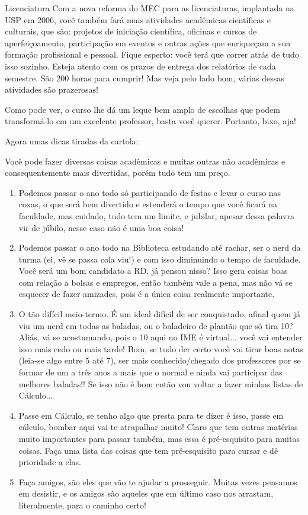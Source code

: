 \begin{subsecao}{Licenciatura}
Com a nova reforma do MEC para as licenciaturas, implantada na USP em 2006,
você também fará mais atividades acadêmicas científicas e culturais, que são:
projetos de iniciação científica, oficinas e cursos de aperfeiçoamento,
participação em eventos e outras ações que enriqueçam a sua formação
profissional e pessoal. Fique esperto: você terá que correr atrás de tudo isso
sozinho. Esteja atento com os prazos de entrega dos relatórios de cada
semestre. São 200 horas para cumprir! Mas veja pelo lado bom, várias dessas
atividades são prazerosas!

Como pode ver, o curso lhe dá um leque bem amplo de escolhas que podem
transformá-lo em um excelente professor, basta você querer. Portanto, bixo, aja!

Agora umas dicas tiradas da cartola:

Você pode fazer diversas coisas acadêmicas e muitas outras não acadêmicas e
consequentemente mais divertidas, porém tudo tem um preço.
\begin{enumerate}
\item	Podemos passar o ano todo só participando de festas e levar o curso nas
coxas, o que será bem divertido e estenderá o tempo que você ficará na
faculdade, mas cuidado, tudo tem um limite, e jubilar, apesar dessa palavra vir
de júbilo, nesse caso não é uma boa coisa!
\item	Podemos passar o ano todo na Biblioteca estudando até rachar, ser o nerd
da turma (ei, vê se passa cola viu!) e com isso diminuindo o tempo de
faculdade. Você será um bom candidato a RD, já pensou nisso? Isso gera coisas
boas com relação a bolsas e empregos, então também vale a pena, mas não vá se
esquecer de fazer amizades, pois é a única coisa realmente importante.
\item	O tão difícil meio-termo. É um ideal difícil de ser conquistado, afinal
quem já viu um nerd em todas as baladas, ou o baladeiro de plantão que só
tira 10? Aliás, vá se acostumando, pois o 10 aqui no IME é virtual... você vai
entender isso mais cedo ou mais tarde! Bom, se tudo der certo você vai tirar
boas notas (leia-se algo entre 5 até 7), ser mais conhecido/chegado dos
professores por se formar de um a três anos a mais que o normal e ainda vai
participar das melhores baladas!! Se isso não é bom então vou voltar a fazer
minhas listas de Cálculo...
\item	Passe em Cálculo, se tenho algo que presta para te dizer é isso, passe em
cálculo, bombar aqui vai te atrapalhar muito! Claro que tem outras matérias
muito importantes para passar também, mas essa é pré-esquisito para muitas
coisas. Faça uma lista das coisas que tem pré-esquisito para cursar e dê
prioridade a elas.
\item	Faça amigos, são eles que vão te ajudar a prosseguir. Muitas vezes
pensamos em desistir, e os amigos são aqueles que em último caso nos arrastam,
literalmente, para o caminho certo!

\end{enumerate}

\end{subsecao}
